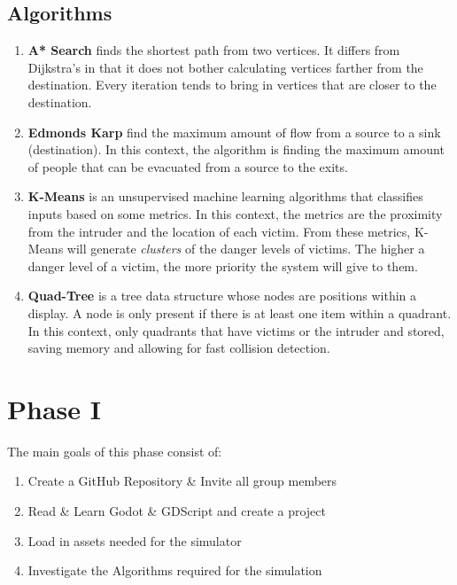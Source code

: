 \documentclass[12pt]{article}
\begin{document}
\subsection*{Algorithms}
\begin{enumerate}
\item \textbf{A* Search} finds the shortest path from two vertices. It differs from Dijkstra's in that it does not bother calculating vertices farther from the destination. Every iteration tends to bring in vertices that are closer to the destination. 
\item \textbf{Edmonds Karp} find the maximum amount of flow from a source to a sink (destination). In this context, the algorithm is finding the maximum amount of people that can be evacuated from a source to the exits.
\item \textbf{K-Means} is an unsupervised machine learning algorithms that classifies inputs based on some metrics. In this context, the metrics are the proximity from the intruder and the location of each victim. From these metrics, K-Means will generate \textit{clusters} of the danger levels of victims. The higher a danger level of a victim, the more priority the system will give to them.
\item \textbf{Quad-Tree} is a tree data structure whose nodes are positions within a display. A node is only present if there is at least one item within a quadrant. In this context, only quadrants that have victims or the intruder and stored, saving memory and allowing for fast collision detection.
\end{enumerate}

\section*{Phase I}
The main goals of this phase consist of:
\begin{enumerate}
\item Create a GitHub Repository \& Invite all group members
\item Read \& Learn Godot \& GDScript and create a project
\item Load in assets needed for the simulator
\item Investigate the Algorithms required for the simulation
\end{enumerate}
\end{document}
